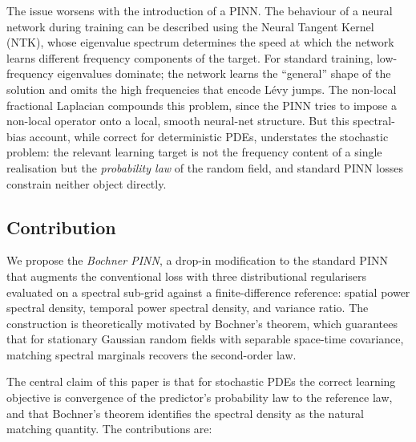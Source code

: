 \documentclass[review,12pt]{elsarticle}
\begin{document}
The issue worsens with the introduction of a PINN. The behaviour of a
neural network during training can be described using the Neural
Tangent Kernel (NTK), whose eigenvalue spectrum determines the speed
at which the network learns different frequency components of the
target. For standard training, low-frequency eigenvalues dominate; the
network learns the ``general'' shape of the solution and omits the
high frequencies that encode L\'evy jumps. The non-local fractional
Laplacian compounds this problem, since the PINN tries to impose a
non-local operator onto a local, smooth neural-net structure.
But this spectral-bias account, while correct for deterministic PDEs,
understates the stochastic problem: the relevant learning target is
not the frequency content of a single realisation but the
\emph{probability law} of the random field, and standard PINN losses
constrain neither object directly.

\subsection{Contribution}
\label{subsec:contribution}

We propose the \emph{Bochner PINN}, a drop-in modification to the
standard PINN that augments the conventional loss with three
distributional regularisers evaluated on a spectral sub-grid against a
finite-difference reference: spatial power spectral density, temporal
power spectral density, and variance ratio. The construction is
theoretically motivated by Bochner's theorem, which guarantees that
for stationary Gaussian random fields with separable space-time
covariance, matching spectral marginals recovers the second-order law.

The central claim of this paper is that for stochastic PDEs the
correct learning objective is convergence of the predictor's
probability law to the reference law, and that Bochner's theorem
identifies the spectral density as the natural matching quantity.
The contributions are:
\end{document}
